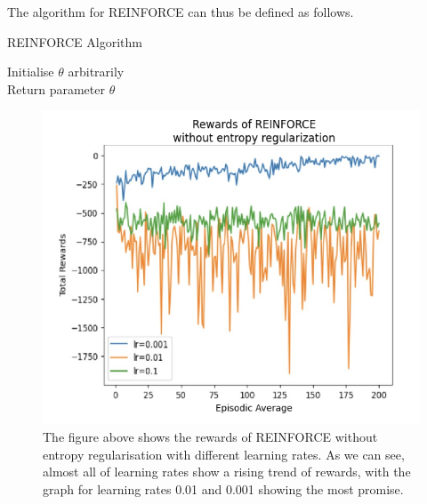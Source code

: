\documentclass{article}
\begin{document}
The algorithm for REINFORCE can thus be defined as follows. 
\begin{algorithm}[htbp]
\caption{REINFORCE Algorithm}
\SetAlgoLined
\DontPrintSemicolon
\small %
Initialise $\theta$ arbitrarily\;\\
Return parameter $\theta$
\end{algorithm}

\begin{figure}[h!]
\centering
\includegraphics[width=0.9\linewidth]{Report/images/02.Rewards_of_REINFORCE_without_ER.png}
\caption{\label{fig:Reinforce Rewards}The figure above shows the rewards of REINFORCE without entropy regularisation with different learning rates. As we can see, almost all of learning rates show a rising trend of rewards, with the graph for learning rates 0.01 and 0.001 showing the most promise. }
\end{figure}
\end{document}
